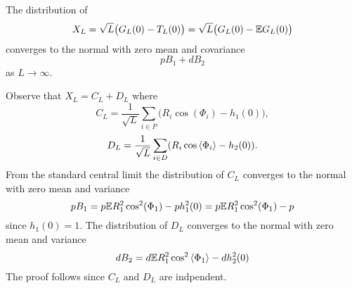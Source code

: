 \documentclass[journal]{IEEEtran}
\begin{document}



\begin{lemma}\label{lem:XL} 
The distribution of 
\[
X_L = \sqrt{L} \big( G_L(0) - T_L(0) \big) = \sqrt{L} \big( G_L(0) - {\mathbb E} G_L(0) \big)
\] 
converges to the normal with zero mean and covariance 
\[
pB_1 + d B_2
\] 
as $L \rightarrow\infty$.
\end{lemma}
\begin{IEEEproof}
Observe that $X_L = C_L + D_L$ where
\[
C_L = \frac{1}{\sqrt{L}} \sum_{i \in P} \big( R_i \cos(\Phi_i) - h_1(0) \big),
\]
\[
D_L = \frac{1}{\sqrt{L}} \sum_{i \in D} (R_i \cos\left\langle \Phi_i \right\rangle - h_2(0) ).
\]
From the standard central limit the distribution of $C_L$ converges to the normal with zero mean and variance
\[
p B_1 = p {\mathbb E} R_1^2 \cos^2(\Phi_1) - p h_1^2(0) =  p {\mathbb E} R_1^2 \cos^2(\Phi_1) - p 
\]
since $h_1(0) = 1$.  The distribution of $D_L$ converges to the normal with zero mean and variance
\[
d B_2 = d {\mathbb E} R_1^2 \cos^2\left\langle \Phi_1 \right\rangle - d h_2^2(0)
\]
The proof follows since $C_L$ and $D_L$ are indpendent.
\end{IEEEproof}
\end{document}

